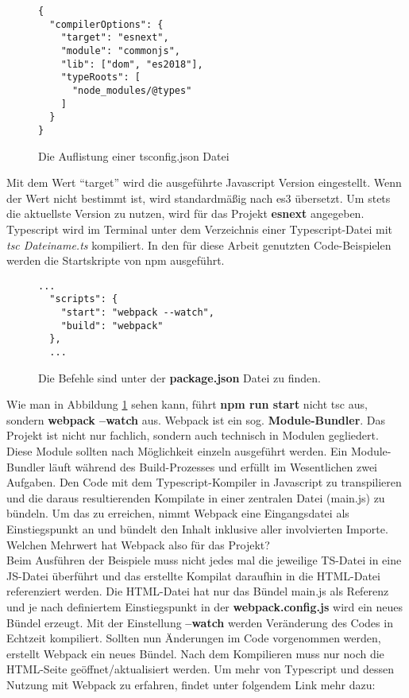 \begin{figure}[H]
\begin{lstlisting}[basicstyle=\small]
{
  "compilerOptions": {
    "target": "esnext",
    "module": "commonjs",
    "lib": ["dom", "es2018"],
    "typeRoots": [
      "node_modules/@types"
    ]
  }
}
\end{lstlisting}
\caption{Die Auflistung einer tsconfig.json Datei}
\end{figure}

\noindent
Mit dem Wert “target” wird die ausgeführte Javascript Version eingestellt. Wenn der Wert nicht bestimmt ist, wird standardmäßig nach es3 übersetzt. Um stets die aktuellste Version zu nutzen, wird für das Projekt \textbf{esnext} angegeben. Typescript wird im Terminal unter dem Verzeichnis einer Typescript-Datei mit \textit{tsc Dateiname.ts} kompiliert. In den für diese Arbeit genutzten Code-Beispielen werden die Startskripte von npm ausgeführt.

\begin{figure}[H]
\begin{lstlisting}[basicstyle=\small]
  ...
  "scripts": {
    "start": "webpack --watch",
    "build": "webpack"
  },
  ...
\end{lstlisting}
\caption{Die Befehle sind unter der \textbf{package.json} Datei zu finden.}
\label{npm-ex-script}
\end{figure}

\noindent
Wie man in Abbildung \ref{npm-ex-script} sehen kann, führt \textbf{npm run start} nicht tsc aus, sondern \textbf{webpack --watch} aus. Webpack ist ein sog. \textbf{Module-Bundler}. Das Projekt ist nicht nur fachlich, sondern auch technisch in Modulen gegliedert. Diese Module sollten nach Möglichkeit einzeln ausgeführt werden. Ein Module-Bundler läuft während des Build-Prozesses und erfüllt im Wesentlichen zwei Aufgaben. Den Code mit dem Typescript-Kompiler in Javascript zu transpilieren und die daraus resultierenden Kompilate in einer zentralen Datei (main.js) zu bündeln. Um das zu erreichen, nimmt Webpack eine Eingangsdatei als Einstiegspunkt an und bündelt den Inhalt inklusive aller involvierten Importe. Welchen Mehrwert hat Webpack also für das Projekt? \\

\noindent
Beim Ausführen der Beispiele muss nicht jedes mal die jeweilige TS-Datei in eine JS-Datei überführt und das erstellte Kompilat daraufhin in die HTML-Datei referenziert werden. Die HTML-Datei hat nur das Bündel main.js als Referenz und je nach definiertem Einstiegspunkt in der \textbf{webpack.config.js} wird ein neues Bündel erzeugt. Mit der Einstellung \textbf{--watch} werden Veränderung des Codes in Echtzeit kompiliert. Sollten nun Änderungen im Code vorgenommen werden, erstellt Webpack ein neues Bündel. Nach dem Kompilieren muss nur noch die HTML-Seite geöffnet/aktualisiert werden. Um mehr von Typescript und dessen Nutzung mit Webpack zu erfahren, findet unter folgendem Link mehr dazu:

